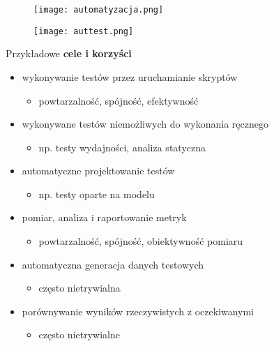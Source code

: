 \documentclass[../main.tex]{subfiles}
\begin{document}
    \begin{figure}[H]
        \texttt{[image: automatyzacja.png]}
    \end{figure}

    \begin{figure}[H]
        \texttt{[image: auttest.png]}
    \end{figure}

    Przykładowe \textbf{cele i korzyści}
    \begin{itemize}
        \item wykonywanie testów przez uruchamianie skryptów
        \begin{itemize}
            \item powtarzalność, spójność, efektywność
        \end{itemize}
        \item wykonywane testów niemożliwych do wykonania ręcznego
        \begin{itemize}
            \item np. testy wydajności, analiza statyczna
        \end{itemize}
        \item automatyczne projektowanie testów
        \begin{itemize}
            \item np. testy oparte na modelu
        \end{itemize}
        \item pomiar, analiza i raportowanie metryk
        \begin{itemize}
            \item powtarzalność, spójność, obiektywność pomiaru
        \end{itemize}
        \item automatyczna generacja danych testowych
        \begin{itemize}
            \item często nietrywialna
        \end{itemize}
        \item porównywanie wyników rzeczywistych z oczekiwanymi
        \begin{itemize}
            \item często nietrywialne
        \end{itemize}
    \end{itemize}
\end{document}

